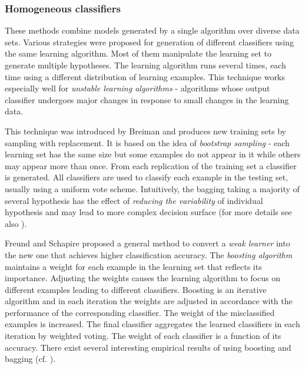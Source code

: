\documentclass{article}
\begin{document}
\subsubsection{Homogeneous classifiers}

These methods combine models generated by a single algorithm over diverse
data sets. Various strategies were proposed for generation of different
classifiers using the same learning algorithm. Most of them manipulate the
learning set to generate multiple hypotheses. The learning algorithm runs
several times, each time using a different distribution of learning
examples. This technique works especially well for {\em unstable learning
algorithms} - algorithms whose output classifier undergoes major changes in
response to small changes in the learning data. \newline


This technique was introduced by Breiman \cite{Bre} and produces
new training sets by sampling with replacement. It is based on the
idea of {\em bootstrap sampling} - each learning set has the same
size but some examples do not appear in it while others may appear
more than once. From each replication of the training set a
classifier is generated. All classifiers are used to classify each
example in the testing set, usually using a uniform vote scheme.
Intuitively, the bagging taking a majority of several hypothesis
has the effect of {\em reducing the variability} of individual
hypothesis and may lead to more complex decision surface (for more
details see also \cite{Gama}).\newline


Freund and Schapire \cite{Freund,Schapire} proposed a general method to
convert a {\em weak learner} into the new one that achieves higher
classification accuracy. The {\em boosting algorithm} maintains a weight for
each example in the learning set that reflects its importance. Adjusting the
weights causes the learning algorithm to focus on different examples leading
to different classifiers. Boosting is an iterative algorithm and in each
iteration the weights are adjusted in accordance with the performance of the
corresponding classifier. The weight of the misclassified examples is
increased. The final classifier aggregates the learned classifiers in each
iteration by weighted voting. The weight of each classifier is a function of
its accuracy. There exist several interesting empirical results of using
boosting and bagging (cf. \cite{Quin98}).\newline
\end{document}
